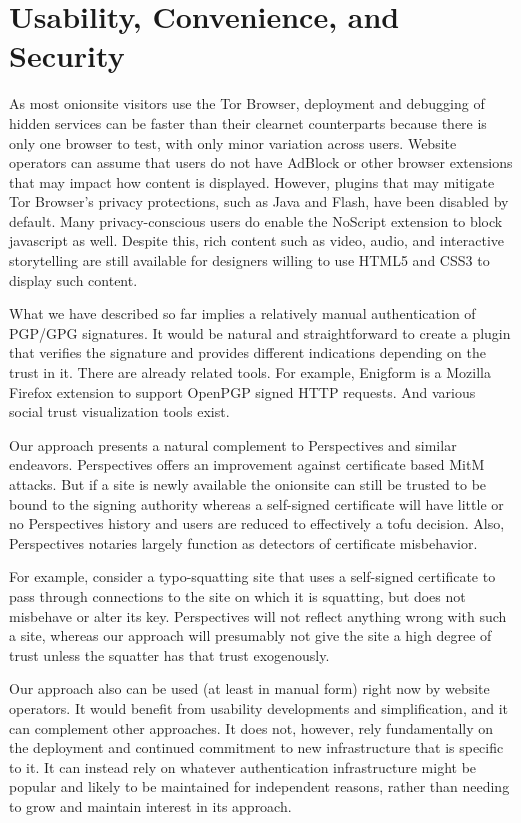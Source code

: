 \documentclass[10pt, conference, compsocconf]{styles/IEEEtran}
\begin{document}
\section{Usability, Convenience, and Security}

As most onionsite visitors use the Tor Browser, deployment and
debugging of hidden services can be faster than their clearnet
counterparts because there is only one browser to test, with only
minor variation across users.  Website operators can assume that users
do not have AdBlock or other browser extensions that may impact how
content is displayed.  However, plugins that may mitigate Tor
Browser's privacy protections, such as Java and Flash, have been
disabled by default.  Many privacy-conscious users do enable the
NoScript extension to block javascript as well.  Despite this, rich
content such as video, audio, and interactive storytelling are still
available for designers willing to use HTML5 and CSS3 to display such
content.

What we have described so far implies a relatively manual
authentication of PGP/GPG signatures. It would be natural and
straightforward to create a plugin that verifies the signature
and provides different indications depending on the trust in it.
There are already related tools. For example, Enigform is a
Mozilla Firefox extension to support OpenPGP signed HTTP requests.
And various social trust visualization tools exist.

Our approach presents a natural complement to Perspectives and similar
endeavors. Perspectives offers an improvement against
certificate based MitM attacks. But if a site is newly available
the onionsite can still be trusted to be bound to the signing
authority whereas a self-signed certificate will have little or no
Perspectives history and users are reduced to effectively a tofu
decision. Also, Perspectives notaries largely function as
detectors of certificate misbehavior. 

For example, consider a typo-squatting site that uses a self-signed
certificate to pass through connections to the site on which it is
squatting, but
does not misbehave or alter its key. Perspectives will not reflect
anything wrong with such a site, whereas our approach will presumably
not give the site a high degree of trust unless the squatter has
that trust exogenously.

Our approach also can be used (at least in manual form) right now by
website operators. It would benefit from usability developments
and simplification, and it can complement other approaches. It does not,
however,
rely fundamentally on the deployment and continued commitment to new
infrastructure that is specific to it.  It can instead
rely on whatever authentication infrastructure might be popular
and likely to be maintained for independent reasons, rather than
needing to grow and maintain interest in its approach.
\end{document}
